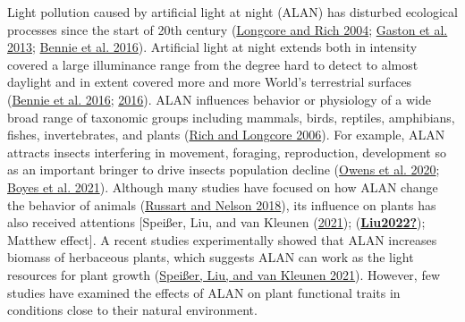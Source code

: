 \documentclass[
  letterpaper,
  DIV=11,
  numbers=noendperiod]{scrartcl}
\begin{document}
Light pollution caused by artificial light at night (ALAN) has disturbed
ecological processes since the start of 20th century
(\protect\hyperlink{ref-Longcore2004}{Longcore and Rich 2004};
\protect\hyperlink{ref-Gaston2013}{Gaston et al. 2013};
\protect\hyperlink{ref-Bennie2016}{Bennie et al. 2016}). Artificial
light at night extends both in intensity covered a large illuminance
range from the degree hard to detect to almost daylight and in extent
covered more and more World's terrestrial surfaces
(\protect\hyperlink{ref-Bennie2016}{Bennie et al. 2016};
\protect\hyperlink{ref-Falchi2016}{2016}). ALAN influences behavior or
physiology of a wide broad range of taxonomic groups including mammals,
birds, reptiles, amphibians, fishes, invertebrates, and plants
(\protect\hyperlink{ref-Rich2006}{Rich and Longcore 2006}). For example,
ALAN attracts insects interfering in movement, foraging, reproduction,
development so as an important bringer to drive insects population
decline (\protect\hyperlink{ref-Owens2020}{Owens et al. 2020};
\protect\hyperlink{ref-Boyes2021}{Boyes et al. 2021}). Although many
studies have focused on how ALAN change the behavior of animals
(\protect\hyperlink{ref-Russart2018}{Russart and Nelson 2018}), its
influence on plants has also received attentions {[}Speißer, Liu, and
van Kleunen (\protect\hyperlink{ref-Speisser2021a}{2021});
(\protect\hyperlink{ref-Liu2022}{\textbf{Liu2022?}}); Matthew effect{]}.
A recent studies experimentally showed that ALAN increases biomass of
herbaceous plants, which suggests ALAN can work as the light resources
for plant growth (\protect\hyperlink{ref-Speisser2021a}{Speißer, Liu,
and van Kleunen 2021}). However, few studies have examined the effects
of ALAN on plant functional traits in conditions close to their natural
environment.
\end{document}
